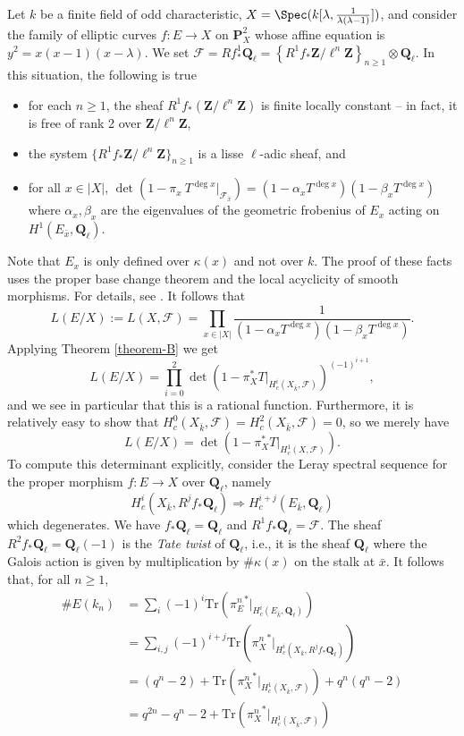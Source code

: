 \noindent
Let $k$ be a finite field of odd characteristic,
$X = \Spec(k[\lambda, \frac{1}{\lambda(\lambda - 1)}])$, and
consider the family of elliptic
curves $f : E \to X$ on $\mathbf{P}^2_X$ whose affine equation is $y^2 =
x(x - 1)(x - \lambda)$. We set $\mathcal{F} = Rf_*^1\mathbf{Q}_\ell =
\left\{R^1f_*\mathbf{Z}/\ell^n\mathbf{Z}\right\}_{n\geq 1} \otimes
\mathbf{Q}_\ell$. In this situation, the following is true
\begin{itemize}
\item for each $n \geq 1$, the sheaf $R^1f_*(\mathbf{Z}/\ell^n\mathbf{Z})$ is
finite locally constant -- in fact, it is free of rank 2 over
$\mathbf{Z}/\ell^n\mathbf{Z}$,
\item the system $\{R^1f_*\mathbf{Z}/\ell^n\mathbf{Z}\}_{n\geq 1}$ is a lisse
$\ell$-adic sheaf, and
\item for all $x\in |X|$,
$\det(1 - \pi_x\ T^{\deg x} |_{\mathcal{F}_{\bar x}}) =
(1 - \alpha_x T^{\deg x})(1 - \beta_x T^{\deg x})$
where $\alpha_x, \beta_x$ are the eigenvalues of the geometric
frobenius of $E_x$ acting on $H^1(E_{\bar x}, \mathbf{Q}_\ell)$.
\end{itemize}
Note that $E_x$ is only defined over $\kappa(x)$ and not over $k$. The proof of
these facts uses the proper base change theorem and the local acyclicity of
smooth morphisms. For details, see \cite{SGA4.5}. It follows that
$$
L(E/X) := L(X, \mathcal{F}) = \prod_{x\in |X|}
\frac{1}{(1-\alpha_xT^{\deg x})(1-\beta_xT^{\deg x })} .
$$
Applying Theorem \ref{theorem-B} we get
$$
L(E/X) =
\prod_{i = 0}^2
\det\left(1 - \pi_X^*T |_{H_c^i(X_{\bar k}, \mathcal{F})}\right)^{(-1)^{i+1}},
$$
and we see in particular that this is a rational function. Furthermore, it is
relatively easy to show that $H_c^0(X_{\bar k}, \mathcal{F}) = H_c^2(X_{\bar
k}, \mathcal{F}) = 0$, so we merely have
$$
L(E/X) = \det(1 - \pi_X^*T |_{H_c^1(X, \mathcal{F})}).
$$
To compute this determinant explicitly, consider the Leray spectral sequence
for the proper morphism $f : E \to X$ over $\mathbf{Q}_\ell$, namely
$$
H_c^i(X_{\bar k}, R^jf_*\mathbf{Q}_\ell) \Rightarrow H_c^{i+j}(E_{\bar
k}, \mathbf{Q}_\ell)
$$
which degenerates. We have $f_*\mathbf{Q}_\ell = \mathbf{Q}_\ell$ and
$R^1f_*\mathbf{Q}_\ell = \mathcal{F}$. The sheaf $R^2f_*\mathbf{Q}_\ell =
\mathbf{Q}_\ell(-1)$ is the {\it Tate twist} of $\mathbf{Q}_\ell$, i.e.,
it is the sheaf $\mathbf{Q}_\ell$ where the Galois action is given by
multiplication by $\#\kappa(x)$ on the stalk at $\bar x$. It follows that,
for all $n\geq 1$,
\begin{align*}
\# E(k_n)
& =
\sum\nolimits_i (-1)^i
\text{Tr}({\pi_E^n}^* |_{H_c^i(E_{\bar k}, \mathbf{Q}_\ell)}) \\
& =
\sum\nolimits_{i, j} (-1)^{i+j}
\text{Tr}({\pi^n_X}^* |_{H_c^i(X_{\bar k}, R^jf_*\mathbf{Q}_\ell)}) \\
& =
(q^n - 2) +
\text{Tr}({\pi_X^n}^* |_{H_c^1(X_{\bar k}, \mathcal{F})}) + q^n(q^n - 2) \\
& =
q^{2n} - q^n - 2 +
\text{Tr}({\pi_X^n}^* |_{H_c^1(X_{\bar k}, \mathcal{F})})
\end{align*}

